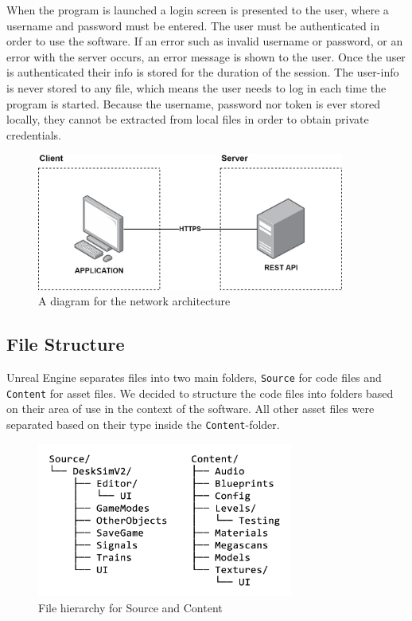 When the program is launched a login screen is presented to the user, where a username and password must be entered. The user must be authenticated in order to use the software. If an error such as invalid username or password, or an error with the server occurs, an error message is shown to the user. Once the user is authenticated their info is stored for the duration of the session. The user-info is never stored to any file, which means the user needs to log in each time the program is started. Because the username, password nor token is ever stored locally, they cannot be extracted from local files in order to obtain private credentials.


\begin{figure}[H]
    \centerline{\includegraphics[width=0.9\textwidth]{figures/NetworkArchitecture.png}}
    \caption{A diagram for the network architecture}
\end{figure} 

\subsection{File Structure}
Unreal Engine separates files into two main folders, \verb|Source| for code files and \verb|Content| for asset files. We decided to structure the code files into folders based on their area of use in the context of the software. All other asset files were separated based on their type inside the \verb|Content|-folder.


\begin{figure}[h]
    \centering
    \includegraphics[width=0.75\textwidth]{figures/Files3.png}
    \caption{File hierarchy for Source and Content}
    \label{Stop_Signal_img}
\end{figure} 


% 

